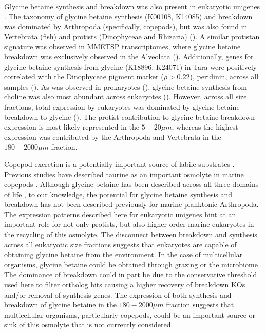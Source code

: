 \documentclass[utf8]{frontiersSCNS} %
\begin{document}
Glycine betaine synthesis and breakdown was also present in eukaryotic unigenes \citep{Carradec2018}. The taxonomy of glycine betaine synthesis (K00108, K14085) and breakdown was dominated by Arthropoda (specifically, copepods), but was also found in Vertebrata (fish) and protists (Dinophyceae and Rhizaria) (). A similar protistan signature was observed in MMETSP transcriptomes, where  glycine betaine breakdown was exclusively observed in the Alveolata (). Additionally, genes for glycine betaine synthesis from glycine (K18896, K24071) in Tara were positively correlated with the Dinophyceae pigment marker ($\rho > 0.22$), peridinin, across all samples (). As was observed in prokaryotes (), glycine betaine synthesis from choline was also most abundant across eukaryotes (). However, across all size fractions, total expression by eukaryotes was dominated by glycine betaine breakdown to glycine (). The protist contribution to glycine betaine breakdown expression is most likely represented in the $5-20\mu m$, whereas the highest expression was contributed by the Arthropoda and Vertebrata in the $180-2000\mu m$ fraction.

Copepod excretion is a potentially important source of labile substrates \citep{Maas2020}. Previous studies have described taurine as an important osmolyte in marine copepods \citep{Clifford2020}. Although glycine betaine has been described across all three domains of life \citep{Yancey2005}, to our knowledge, the potential for glycine betaine synthesis and breakdown has not been described previously for marine planktonic Arthropoda. The expression patterns described here for eukaryotic unigenes hint at an important role for not only protists, but also higher-order marine eukaryotes in the recycling of this osmolyte. The disconnect between breakdown and synthesis across all eukaryotic size fractions suggests that eukaryotes are capable of obtaining glycine betaine from the environment. In the case of multicellular organisms, glycine betaine could be obtained through grazing or the microbiome \citep{Shoemaker2017}. The dominance of breakdown could in part be due to the conservative threshold used here to filter ortholog hits causing a higher recovery of breakdown KOs and/or removal of synthesis genes. The expression of both synthesis and breakdown of glycine betaine in the $180-2000 \mu m$ fraction suggests that multicellular organisms, particularly copepods, could be an important source or sink of this osmolyte that is not currently considered.
\end{document}
